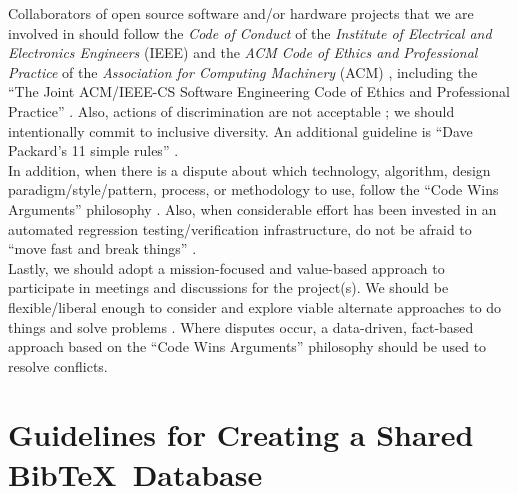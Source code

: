 \documentclass[letter,12pt]{article}
\begin{document}
Collaborators of open source software and/or hardware projects that we are involved in should follow the {\it Code of Conduct} of the {\it Institute of Electrical and Electronics Engineers} (IEEE) \cite{IEEE2014b,IEEE2014a,IEEE2014} and the {\it ACM Code of Ethics and Professional Practice} of the {\it Association for Computing Machinery} (ACM) \cite{Gotterbarn2018b,Gotterbarn2018a,Gotterbarn2018,Brinkman2016a,ACMCouncil1992,Brinkman2017,Brinkman2016,Wolf2016,Anderson1993}, including the ``The Joint {ACM/IEEE-CS} Software Engineering Code of Ethics and Professional Practice'' \cite{Gotterbarn1999,Gotterbarn1997}. Also, actions of discrimination are not acceptable \cite{IEEE2014c}; we should intentionally commit to inclusive diversity. An additional guideline is ``Dave Packard's 11 simple rules'' \cite{HewlettPackardCompany2012}. \\


In addition, when there is a dispute about which technology, algorithm, design paradigm/style/pattern, process, or methodology to use, follow the ``Code Wins Arguments'' philosophy \cite{Kushner2011,Zuckerberg2012}. Also, when considerable effort has been invested in an automated regression testing/verification infrastructure, do not be afraid to ``move fast and break things'' \cite{Fong2011,Evangelista2012}. \\

Lastly, we should adopt a mission-focused and value-based approach to participate in meetings and discussions for the project(s). We should be flexible/liberal enough to consider and explore viable alternate approaches to do things and solve problems \cite{Beedle2001,Beedle2001a}. Where disputes occur, a data-driven, fact-based approach based on the ``Code Wins Arguments'' philosophy should be used to resolve conflicts.

\section{Guidelines for Creating a Shared {\sc Bib}\TeX\ Database}
\label{sec:GuidelinesforCreatingaSharedBibTeXDatabase}
\end{document}
